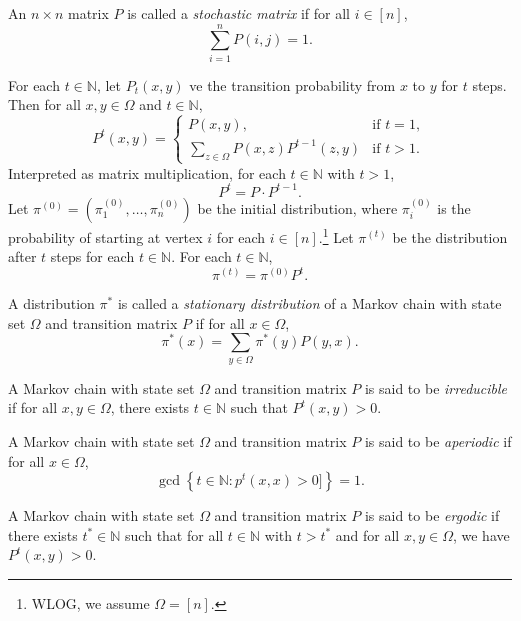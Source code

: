\documentclass[letterpaper, reqno,11pt]{article}
\newcommand{\NN}{\mathbb{N}}
\begin{document}
\begin{definition}
  An $n \times n$ matrix $P$ is called a \emph{stochastic matrix} if for all $i \in [n]$,
  $$ \sum_{i = 1}^n P(i, j) = 1. $$
\end{definition}

For each $t \in \NN$, let $P_t(x, y)$ ve the transition probability from $x$ to $y$ for $t$ steps. Then for all $x, y \in \Omega$ and $t \in \NN$,
$$ P^t(x, y) = \left\{
  \begin{array}{ll}
    P(x, y), & \text{if $t = 1$}, \\
    \sum_{z \in \Omega} P(x, z) P^{t - 1}(z, y) & \text{if $t > 1$}.
  \end{array}
\right. $$
Interpreted as matrix multiplication, for each $t \in \NN$ with $t > 1$,
$$ P^t = P \cdot P^{t - 1}. $$
Let $\pi^{(0)} = (\pi_1^{(0)}, \ldots, \pi_n^{(0)})$ be the initial distribution, where $\pi_i^{(0)}$ is the probability of starting at vertex $i$ for each $i \in [n]$.\footnote{WLOG, we assume $\Omega = [n]$.} Let $\pi^{(t)}$ be the distribution after $t$ steps for each $t \in \NN$. For each $t \in \NN$,
$$ \pi^{(t)} = \pi^{(0)} P^t. $$

\begin{definition}
  A distribution $\pi^*$ is called a \emph{stationary distribution} of a Markov chain with state set $\Omega$ and transition matrix $P$ if for all $x \in \Omega$,
  $$ \pi^*(x) = \sum_{y \in \Omega} \pi^*(y) P(y, x). $$
\end{definition}

\begin{definition}
  A Markov chain with state set $\Omega$ and transition matrix $P$ is said to be \emph{irreducible} if for all $x, y \in \Omega$, there exists $t \in \NN$ such that $P^t(x, y) > 0$.
\end{definition}

\begin{definition}
  A Markov chain with state set $\Omega$ and transition matrix $P$ is said to be \emph{aperiodic} if for all $x \in \Omega$,
  $$ \gcd\left\{ t \in \NN : p^t(x, x) > 0 ]\right\} = 1. $$
\end{definition}

\begin{definition}
  A Markov chain with state set $\Omega$ and transition matrix $P$ is said to be \emph{ergodic} if there exists $t^* \in \NN$ such that for all $t \in \NN$ with $t > t^*$ and for all $x, y \in \Omega$, we have $P^t(x, y) > 0$.
\end{definition}
\end{document}
